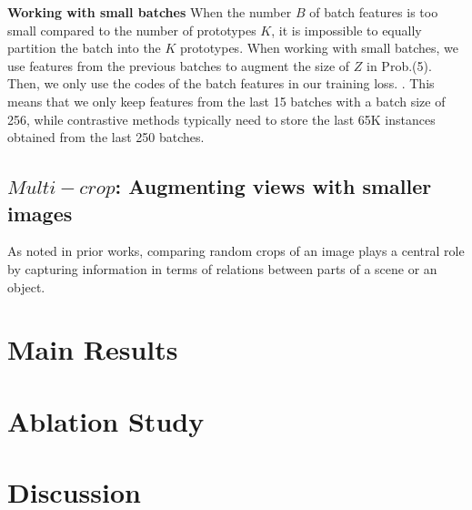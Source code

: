 \documentclass{tufte-handout}
\begin{document}
\textbf{Working with small batches} When the number $B$ of batch features is too small compared to the number of prototypes $K$, it is impossible to equally partition the batch into the $K$ prototypes.
When working with small batches, we use features from the previous batches to augment the size of $Z$ in Prob.(5). 
Then, we only use the codes of the batch features in our training loss. .
This means that we only keep features from the last 15 batches with a batch size of 256, while contrastive methods typically need to store the last 65K instances obtained from the last 250 batches.

\subsection{$Multi-crop$: Augmenting views with smaller images}
As noted in prior works, comparing random crops of an image plays a central role by capturing information in terms of relations between parts of a scene or an object.

\section{Main Results}
\section{Ablation Study}
\section{Discussion}






\end{document}
